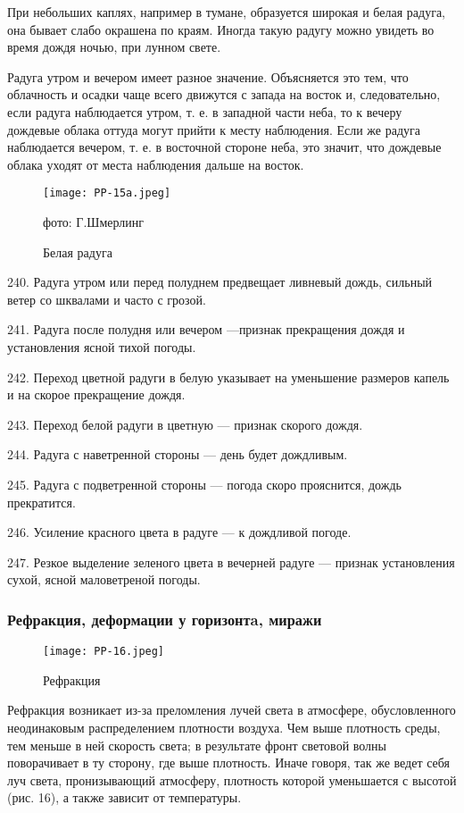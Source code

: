 При небольших каплях, например в тумане, образуется широкая и белая радуга, она бывает слабо окрашена по краям. Иногда такую радугу можно увидеть во время дождя ночью, при лунном свете.

Радуга утром и вечером имеет разное значение. Объясняется это тем, что облачность и осадки чаще всего движутся с запада на восток и, следовательно, если радуга наблюдается утром, т. е. в западной части неба, то к вечеру дождевые облака оттуда могут прийти к месту наблюдения. Если же радуга наблюдается вечером, т. е. в восточной стороне неба, это значит, что дождевые облака уходят от места наблюдения дальше на восток.

\begin{figure}[htb]
  \centering{}
  \texttt{[image: PP-15a.jpeg]}
  \caption{Белая радуга}
  \label{fig:pp15a}
  \small
  \centering{}фото: Г.Шмерлинг
\end{figure}

240. Радуга утром или перед полуднем предвещает ливневый дождь, сильный ветер со шквалами и часто с грозой.

241. Радуга после полудня или вечером —признак прекращения дождя и установления ясной тихой погоды.

242. Переход цветной радуги в белую указывает на уменьшение размеров капель и на скорое прекращение дождя.

243. Переход белой радуги в цветную — признак скорого дождя.

244. Радуга с наветренной стороны — день будет дождливым.

245. Радуга с подветренной стороны — погода скоро прояснится, дождь прекратится.

246. Усиление красного цвета в радуге — к дождливой погоде.

247. Резкое выделение зеленого цвета в вечерней радуге — признак установления сухой, ясной маловетреной погоды.

\subsubsection{Рефракция, деформации у горизонтa, миражи}

\begin{figure}[htb]
  \centering{}
  \texttt{[image: PP-16.jpeg]}
  \caption{Рефракция}
  \label{fig:pp16}
  \small
  \centering{}
\end{figure}

Рефракция возникает из-за преломления лучей света в атмосфере, обусловленного неодинаковым распределением плотности воздуха. Чем выше плотность среды, тем меньше в ней скорость света; в результате фронт световой волны поворачивает в ту сторону, где выше плотность. Иначе говоря, так же ведет себя луч света, пронизывающий атмосферу, плотность которой уменьшается с высотой (рис. 16), а также зависит от температуры.

